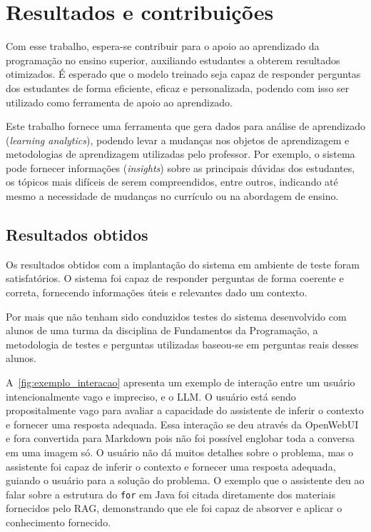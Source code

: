 \documentclass[journal]{IEEEtran}
\begin{document}
\section{Resultados e contribuições\label{sec:resultados}}

\noindent%
Com esse trabalho, espera-se contribuir para o apoio ao aprendizado da programação no ensino superior, auxiliando estudantes a obterem resultados otimizados.
É esperado que o modelo treinado seja capaz de responder perguntas dos estudantes de forma eficiente, eficaz e personalizada, podendo com isso ser utilizado como ferramenta de apoio ao aprendizado.

Este trabalho fornece uma ferramenta que gera dados para análise de aprendizado (\textit{learning analytics}), podendo levar a mudanças nos objetos de aprendizagem e metodologias de aprendizagem utilizadas pelo professor.
Por exemplo, o sistema pode fornecer informações (\textit{insights}) sobre as principais dúvidas dos estudantes, os tópicos mais difíceis de serem compreendidos, entre outros, indicando até mesmo a necessidade de mudanças no currículo ou na abordagem de ensino.

\subsection{Resultados obtidos}

\noindent%
Os resultados obtidos com a implantação do sistema em ambiente de teste foram satisfatórios.
O sistema foi capaz de responder perguntas de forma coerente e correta, fornecendo informações úteis e relevantes dado um contexto.

Por mais que não tenham sido conduzidos testes do sistema desenvolvido com alunos de uma turma da disciplina de Fundamentos da Programação, a metodologia de testes e perguntas utilizadas baseou-se em perguntas reais desses alunos.

A~\cref{fig:exemplo_interacao} apresenta um exemplo de interação entre um usuário intencionalmente vago e impreciso, e o LLM\@.
O usuário está sendo propositalmente vago para avaliar a capacidade do assistente de inferir o contexto e fornecer uma resposta adequada.
Essa interação se deu através da OpenWebUI e fora convertida para Markdown pois não foi possível englobar toda a conversa em uma imagem só.
O usuário não dá muitos detalhes sobre o problema, mas o assistente foi capaz de inferir o contexto e fornecer uma resposta adequada, guiando o usuário para a solução do problema.
O exemplo que o assistente deu ao falar sobre a estrutura do \texttt{for} em Java foi citada diretamente dos materiais fornecidos pelo RAG, demonstrando que ele foi capaz de absorver e aplicar o conhecimento fornecido.
\end{document}
